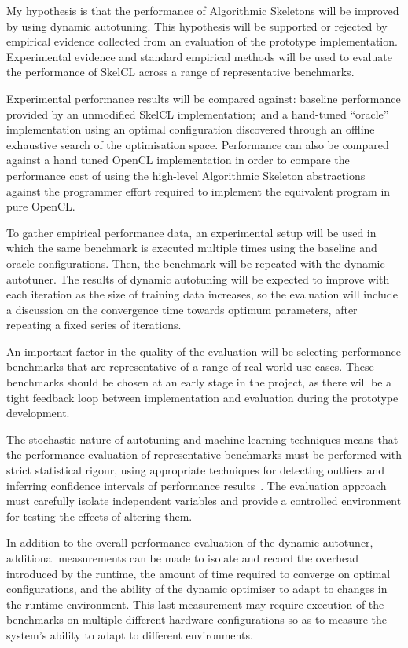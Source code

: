 My hypothesis is that the performance of Algorithmic Skeletons will be
improved by using dynamic autotuning. This hypothesis will be
supported or rejected by empirical evidence collected from an
evaluation of the prototype implementation. Experimental evidence and
standard empirical methods will be used to evaluate the performance of
SkelCL across a range of representative benchmarks.

Experimental performance results will be compared against: baseline
performance provided by an unmodified SkelCL implementation;\ and a
hand-tuned ``oracle'' implementation using an optimal configuration
discovered through an offline exhaustive search of the optimisation
space. Performance can also be compared against a hand tuned OpenCL
implementation in order to compare the performance cost of using the
high-level Algorithmic Skeleton abstractions against the programmer
effort required to implement the equivalent program in pure OpenCL.

To gather empirical performance data, an experimental setup will be
used in which the same benchmark is executed multiple times using the
baseline and oracle configurations. Then, the benchmark will be
repeated with the dynamic autotuner. The results of dynamic autotuning
will be expected to improve with each iteration as the size of
training data increases, so the evaluation will include a discussion
on the convergence time towards optimum parameters, after repeating a
fixed series of iterations.

An important factor in the quality of the evaluation will be selecting
performance benchmarks that are representative of a range of real
world use cases. These benchmarks should be chosen at an early stage
in the project, as there will be a tight feedback loop between
implementation and evaluation during the prototype development.

The stochastic nature of autotuning and machine learning techniques
means that the performance evaluation of representative benchmarks
must be performed with strict statistical rigour, using appropriate
techniques for detecting outliers and inferring confidence intervals
of performance results~\cite{Georges2007}. The evaluation approach
must carefully isolate independent variables and provide a controlled
environment for testing the effects of altering them.

In addition to the overall performance evaluation of the dynamic
autotuner, additional measurements can be made to isolate and record
the overhead introduced by the runtime, the amount of time required to
converge on optimal configurations, and the ability of the dynamic
optimiser to adapt to changes in the runtime environment. This last
measurement may require execution of the benchmarks on multiple
different hardware configurations so as to measure the system's
ability to adapt to different environments.
